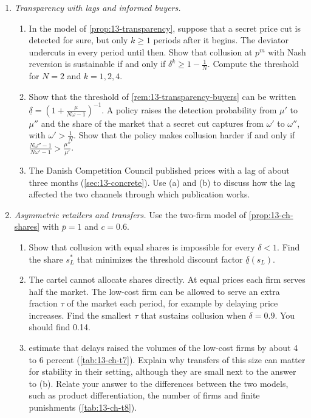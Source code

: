 \begin{enumerate}[label=\arabic*., leftmargin=*, itemsep=6pt]
\item \textit{Transparency with lags and informed buyers.}
\begin{enumerate}[label=(\alph*)]
  \item In the model of \cref{prop:13-transparency}, suppose that a secret price cut is detected for sure, but only
  $k \ge 1$ periods after it begins. The deviator undercuts in every period until then. Show that
  collusion at $p^m$ with Nash reversion is sustainable if and only if $\delta^k \ge 1 - \frac{1}{N}$. Compute the
  threshold for $N = 2$ and $k = 1, 2, 4$.
  \item Show that the threshold of \cref{rem:13-transparency-buyers} can be written
  $\underline\delta = \left(1 + \frac{\mu}{N\omega - 1}\right)^{-1}$. A policy raises the detection probability
  from $\mu'$ to $\mu''$ and the share of the market that a secret cut captures from $\omega'$ to $\omega''$, with
  $\omega' > \frac{1}{N}$. Show that the policy makes collusion harder if and only if
  $\frac{N\omega'' - 1}{N\omega' - 1} > \frac{\mu''}{\mu'}$.
  \item The Danish Competition Council published prices with a lag of about three months
  (\cref{sec:13-concrete}). Use (a) and (b) to discuss how the lag affected the two channels through which
  publication works.
\end{enumerate}

\item \textit{Asymmetric retailers and transfers.} Use the two-firm model of \cref{prop:13-ch-shares} with
$\bar p = 1$ and $c = 0.6$.
\begin{enumerate}[label=(\alph*)]
  \item Show that collusion with equal shares is impossible for every $\delta < 1$. Find the share $s_L^*$ that
  minimizes the threshold discount factor $\underline\delta(s_L)$.
  \item The cartel cannot allocate shares directly. At equal prices each firm serves half the market. The low-cost
  firm can be allowed to serve an extra fraction $\tau$ of the market each period, for example by delaying price
  increases. Find the smallest $\tau$ that sustains collusion when $\delta = 0.9$. You should find 0.14.
  \item \citet{ClarkHoude2013} estimate that delays raised the volumes of the low-cost firms by about 4 to 6
  percent (\cref{tab:13-ch-t7}). Explain why transfers of this size can matter for stability in their setting,
  although they are small next to the answer to (b). Relate your answer to the differences between the two models,
  such as product differentiation, the number of firms and finite punishments (\cref{tab:13-ch-t8}).
\end{enumerate}


\end{enumerate}
